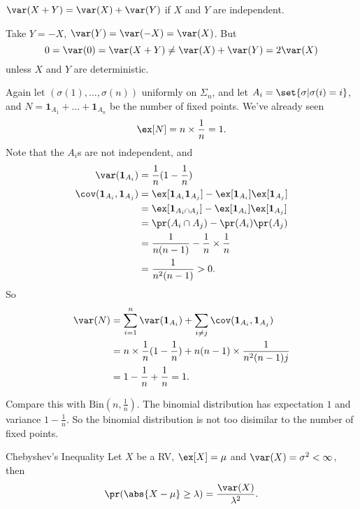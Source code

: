 \begin{example}
    \(\var(X + Y) = \var(X) + \var(Y)\) if \(X\) and \(Y\) are independent.

    Take \(Y = -X\), \(\var(Y) = \var(-X) = \var(X)\). But
    \[
        0 = \var(0) = \var(X + Y) \neq \var(X) + \var(Y) = 2 \var(X)
    \]
    unless \(X\) and \(Y\) are deterministic.
\end{example}
\begin{example}
    Again let \((\sigma(1), \dots, \sigma(n))\) uniformly on \(\Sigma_n\), and let \(A_i = \set{\sigma| \sigma(i) = i}\), and \(N = \textbf{1}_{A_1} + \dots + \textbf{1}_{A_n}\) be the number of fixed points. We've already seen
    \[
        \ex[N] = n \times\frac{1}{n} = 1.
    \]
    Note that the \(A_i\)s are not independent, and
    \begin{align*}
        \var(\textbf{1}_{A_i}) &= \frac{1}{n}(1 - \frac{1}{n}) \\
        \cov(\textbf{1}_{A_i}, \textbf{1}_{A_j}) &= \ex[\textbf{1}_{A_i}\textbf{1}_{A_j}] - \ex[\textbf{1}_{A_i}]\ex[\textbf{1}_{A_j}]\\
        &= \ex[\textbf{1}_{A_i \cap A_j}] - \ex[\textbf{1}_{A_i}]\ex[\textbf{1}_{A_j}]\\
        &= \pr(A_i \cap A_j) - \pr(A_i)\pr(A_j)\\
        &= \frac{1}{n(n - 1)} - \frac{1}{n} \times\frac{1}{n}\\
        &= \frac{1}{n^2(n - 1)} > 0.
    \end{align*}
    So
    \begin{align*}
        \var(N) &= \sum_{i=1}^n \var(\textbf{1}_{A_i}) + \sum_{i\neq j}\cov(\textbf{1}_{A_i}, \textbf{1}_{A_j})\\
        &= n \times \frac{1}{n} (1 - \frac{1}{n}) + n(n-1) \times \frac{1}{n^2(n - 1)j}\\
        &= 1 - \frac{1}{n} + \frac{1}{n} = 1.
    \end{align*}

    Compare this with \(\mathrm{Bin}(n, \frac{1}{n})\). The binomial distribution has expectation \(1\) and variance \(1 - \frac{1}{n}\). So the binomial distribution is not too disimilar to the number of fixed points.
\end{example}
\begin{theorem}{Chebyshev's Inequality}{}
    Let \(X\) be a RV, \(\ex[X] = \mu\) and \(\var(X) = \sigma^2 < \infty\), then
    \[
        \pr(\abs{X - \mu} \geq \lambda) = \frac{\var(X)}{\lambda^2}.
    \]
\end{theorem}
